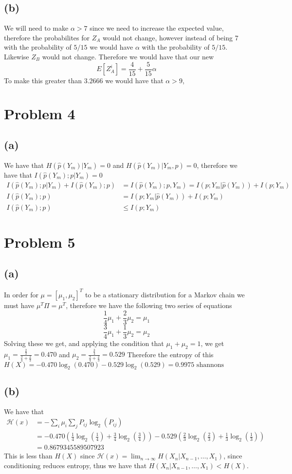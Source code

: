 \subsection*{(b)}
We will need to make $\alpha>7$ since we need to increase the expected value,
therefore the probabilites for $Z_A$ would not change, however instead 
of being 7 with the probability of $5/15$ we would have $\alpha$ with the
probability of $5/15$. Likewise $Z_B$ would not change. Therefore we would have that
our new 
$$E[Z_A^i]=\frac{4}{15}+\frac{5}{15}\alpha$$
To make this greater than $3.2666$ we would have that
$\boxed{\alpha>9}$, 
\section*{Problem 4}
\subsection*{(a)}
We have that $H(\hat{p}(Y_m)|Y_m)=0$ and $H(\hat{p}(Y_m)|Y_m,p)=0$, therefore
we have that $I(\hat{p}(Y_m);p|Y_m)=0$ 
\begin{align*}
    I(\hat{p}(Y_m);p|Y_m)+I(\hat{p}(Y_m);p)&=I(\hat{p}(Y_m);p,Y_m)
            =I(p;Y_m|\hat{p}(Y_m))+I(p;Y_m)\\
            I(\hat{p}(Y_m);p)&=I(p;Y_m|\hat{p}(Y_m))+I(p;Y_m)\\
            I(\hat{p}(Y_m);p)&\leq I(p;Y_m)
\end{align*}
\section*{Problem 5}
\subsection*{(a)}
In order for $\mu=[\mu_1,\mu_2]^T$ to be a stationary distribution for 
a Markov chain we must have $\mu^T\Pi=\mu^T$, therefore we have the 
following two series of equations
$$\frac{1}{4}\mu_1+\frac{2}{3}\mu_2=\mu_1$$
$$\frac{3}{4}\mu_1+\frac{1}{3}\mu_2=\mu_2$$
Solving these we get, and applying the condition that $\mu_1+\mu_2=1$,
we get $\mu_1=\frac{\frac{2}{3}}{\frac{3}{4}+\frac{2}{3}}=\boxed{0.470}$ and
$\mu_2=\frac{\frac{3}{4}}{\frac{3}{4}+\frac{2}{3}}=\boxed{0.529}$ Therefore the 
entropy of this $H(X)=-0.470\log_2(0.470)-0.529\log_2(0.529)=\boxed{0.9975\text{ shannons}}$
\subsection*{(b)}
We have that 
\begin{align*}
    \mathcal{H}(x)&=-\sum_{i}\mu_i\sum_{j}P_{ij}\log_2(P_{ij})\\
    &=-0.470\left(\frac{1}{4}\log_2\left(\frac{1}{4}\right)+
    \frac{3}{4}\log_2\left(\frac{3}{4}\right)\right)-0.529\left(\frac{2}{3}\log_2\left(\frac{2}{3}\right)+
    \frac{1}{3}\log_2\left(\frac{1}{3}\right)\right)\\
    &=\boxed{0.8679345589507923}
\end{align*}
This is less than $H(X)$ since 
$\mathcal{H}(x)=\lim_{n\to\infty}H(X_n|X_{n-1},\dots,X_1)$, 
since conditioning reduces entropy, thus we have that 
$H(X_n|X_{n-1},\dots,X_1)<H(X)$.
